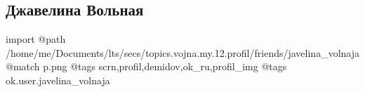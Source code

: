  
 
 
 
 

\subsection{Джавелина Вольная}

\ifcmt
 import
 @path /home/me/Documents/lts/secs/topics.vojna.my.12.profil/friends/javelina_volnaja
 @match p.png
 @tags scrn,profil,demidov,ok_ru,profil_img
 @tags ok.user.javelina_volnaja
\fi

